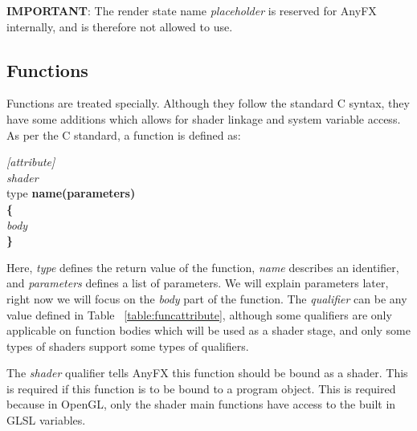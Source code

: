 \documentclass{article}
\newcommand{\SyntaxBox}[1]
{	
	\begin{center}
	\colorbox{orange!60}
	{
		\begin{minipage}{\linewidth}
		\hfill
		\begin{tabbing}
		#1
		\end{tabbing}
		\end{minipage}
	}
	\end{center}
}
\begin{document}
\textbf{IMPORTANT}: The render state name \textit{placeholder} is reserved for AnyFX internally, and is therefore not allowed to use.

\subsection{Functions}
Functions are treated specially. Although they follow the standard C syntax, they have some additions which allows for shader linkage and system variable access. As per the C standard, a function is defined as:

\SyntaxBox
{
	\textit{[attribute]} \\
	\textit{shader} \\
	type \textbf{name(parameters)} \\
	\textbf{\{ } \= \\
	\>	\textit{body} \\
	\textbf{\} } \\
}

Here, \textit{type} defines the return value of the function, \textit{name} describes an identifier, and \textit{parameters} defines a list of parameters. We will explain parameters later, right now we will focus on the \textit{body} part of the function. The \textit{qualifier} can be any value defined in Table ~\ref{table:funcattribute}, although some qualifiers are only applicable on function bodies which will be used as a shader stage, and only some types of shaders support some types of qualifiers.

The \textit{shader} qualifier tells AnyFX this function should be bound as a shader. This is required if this function is to be bound to a program object. This is required because in OpenGL, only the shader main functions have access to the built in GLSL variables.
\end{document}
